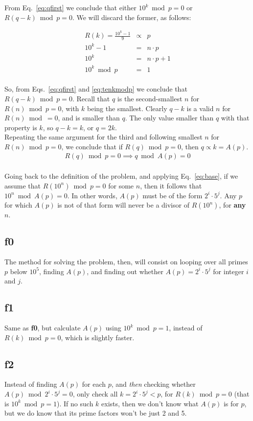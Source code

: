 \documentclass[english]{article}
\begin{document}
From Eq.~\ref{eq:qfirst} we conclude that either $10^k \bmod p = 0$ or $R(q-k) \bmod p = 0$. We will discard the former, as follows:

\begin{eqnarray}
 R(k) = \frac{10^k - 1}{9} & \propto & p \\
10^k - 1 & = & n\cdot p \\
10^k & = & n\cdot p + 1 \\
10^k \bmod p & = & 1 \label{eq:tenkmodp}
\end{eqnarray}\\

So, from Eqs.~\ref{eq:qfirst} and \ref{eq:tenkmodp} we conclude that $R(q-k) \bmod p = 0$. Recall that $q$ is the second-smallest $n$ for $R(n) \bmod p = 0$, with $k$ being the smallest. Clearly $q-k$ is a valid $n$ for $R(n) \bmod = 0$, and is smaller than $q$. The only value smaller than $q$ with that property is $k$, so $q - k = k$, or $q = 2k$.\\

Repeating the same argument for the third and following smallest $n$ for $R(n) \bmod p = 0$, we conclude that if $R(q) \bmod p = 0$, then $q \propto k = A(p)$.\\

\begin{eqnarray}
R(q) \bmod p = 0 \implies q \bmod A(p) = 0 \label{eq:base}
\end{eqnarray}\\

Going back to the definition of the problem, and applying Eq.~\ref{eq:base}, if we assume that $R(10^n) \bmod p = 0$ for some $n$, then it follows that $10^n \bmod A(p) = 0$. In other words, $A(p)$ must be of the form $2^i\cdot 5^j$. Any $p$ for which $A(p)$ is not of that form will never be a divisor of $R(10^n)$, for {\bf any} $n$.\\

\subsection{f0}

The method for solving the problem, then, will consist on looping over all primes $p$ below $10^5$, finding $A(p)$, and finding out whether $A(p) = 2^i\cdot 5^j$ for integer $i$ and $j$.

\subsection{f1}

Same as {\bf f0}, but calculate $A(p)$ using $10^k \bmod p = 1$, instead of $R(k) \bmod p = 0$, which is slightly faster.

\subsection{f2}

Instead of finding $A(p)$ for each $p$, and {\it then} checking whether $A(p) \bmod 2^i\cdot 5^j = 0$, only check all $k = 2^i\cdot 5^j < p$, for $R(k) \bmod p = 0$ (that is $10^k \bmod p = 1$). If no such $k$ exists, then we don't know what $A(p)$ is for $p$, but we do know that its prime factors won't be just 2 and 5.
\end{document}
